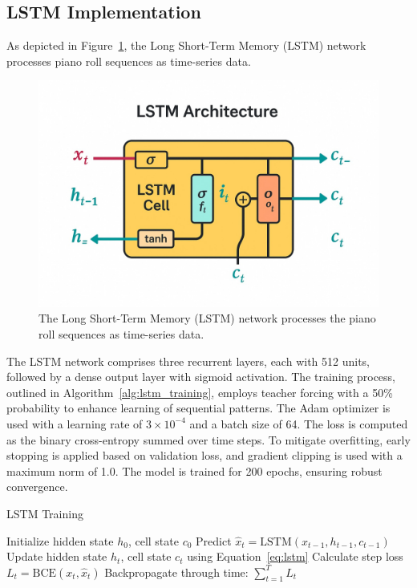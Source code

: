 \documentclass[conference]{IEEEtran}
\begin{document}
\subsection{LSTM Implementation}
As depicted in Figure~\ref{fig:lstm_arch}, the Long Short-Term Memory (LSTM) network processes piano roll sequences as time-series data.
\begin{figure}[h]
    \centering
    \includegraphics[width=\linewidth]{LSTM.jpg}
    \caption{The Long Short-Term Memory (LSTM) network processes the piano roll sequences as time-series data.}
    \label{fig:lstm_arch}
\end{figure}

The LSTM network comprises three recurrent layers, each with 512 units, followed by a dense output layer with sigmoid activation. The training process, outlined in Algorithm~\ref{alg:lstm_training}, employs teacher forcing with a 50\% probability to enhance learning of sequential patterns. The Adam optimizer is used with a learning rate of $3 \times 10^{-4}$ and a batch size of 64. The loss is computed as the binary cross-entropy summed over time steps. To mitigate overfitting, early stopping is applied based on validation loss, and gradient clipping is used with a maximum norm of 1.0. The model is trained for 200 epochs, ensuring robust convergence.

\begin{algorithm}[H]
\caption{LSTM Training}
\label{alg:lstm_training}
\begin{algorithmic}[1]
\STATE Initialize hidden state $h_0$, cell state $c_0$
        \STATE Predict $\hat{x}_t = \text{LSTM}(x_{t-1}, h_{t-1}, c_{t-1})$
        \STATE Update hidden state $h_t$, cell state $c_t$ using Equation~\ref{eq:lstm}
        \STATE Calculate step loss $L_t = \text{BCE}(x_t, \hat{x}_t)$
    \ENDFOR
    \STATE Backpropagate through time: $\sum_{t=1}^{T} L_t$
\ENDFOR
\end{algorithmic}
\end{algorithm}
\end{document}
